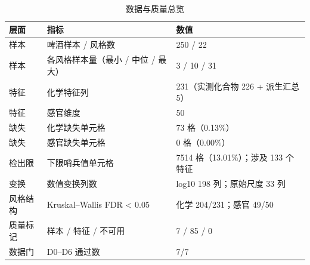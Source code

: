 \begin{table}[tbp]
\centering
\caption{数据与质量总览}
\label{tab:t01_data_overview}
\footnotesize
\setlength{\tabcolsep}{3.5pt}
\begin{tabular}{lll}
\toprule
层面 & 指标 & 数值 \\
\midrule
样本 & 啤酒样本 / 风格数 & 250 / 22 \\
样本 & 各风格样本量（最小 / 中位 / 最大） & 3 / 10 / 31 \\
特征 & 化学特征列 & 231（实测化合物 226 + 派生汇总 5） \\
特征 & 感官维度 & 50 \\
缺失 & 化学缺失单元格 & 73 格（0.13\%） \\
缺失 & 感官缺失单元格 & 0 格（0.00\%） \\
检出限 & 下限哨兵值单元格 & 7514 格（13.01\%）；涉及 133 个特征 \\
变换 & 数值变换列数 & log10 198 列；原始尺度 33 列 \\
风格结构 & Kruskal–Wallis FDR < 0.05 & 化学 204/231；感官 49/50 \\
质量标记 & 样本 / 特征 / 不可用 & 7 / 85 / 0 \\
数据门 & D0–D6 通过数 & 7/7 \\
\bottomrule
\end{tabular}
\end{table}
